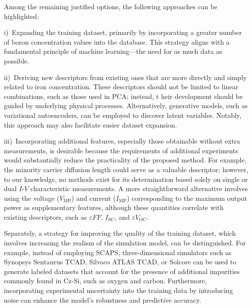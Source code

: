 \documentclass[a4paper,fleqn]{cas-sc}
\begin{document}
Among the remaining justified options, the following approaches can be highlighted:

\noindent
i)~Expanding the training dataset, primarily by incorporating a greater number of boron concentration values into the database. 
This strategy aligns with a fundamental principle of machine learning—the need for as much data as possible.

\noindent
ii)~Deriving new descriptors from existing ones that are more directly and simply related to iron concentration. 
These descriptors should not be limited to linear combinations, such as those used in PCA; instead, t
heir development should be guided by underlying physical processes. 
Alternatively, generative models, such as variational autoencoders, 
can be employed to discover latent variables. 
Notably, this approach may also facilitate easier dataset expansion.

\noindent
iii)~Incorporating additional features, especially those obtainable without extra measurements, 
is desirable because the requirements of additional experiments would substantially reduce 
the practicality of the proposed method. 
For example, the minority carrier diffusion length could serve as a valuable descriptor; 
however, to our knowledge, no methods exist for its determination based solely
on single or dual $I$-$V$ characteristic measurements. 
A more straightforward alternative involves using the voltage ($V_\mathrm{MP}$) and current ($I_\mathrm{MP}$) 
corresponding to the maximum output power as supplementary features, 
although these quantities correlate with existing descriptors, such as $\varepsilon F\!F$, $I_\mathrm{SC}$, 
and $\varepsilon V_\mathrm{OC}$.

Separately, a strategy for improving the quality of the training dataset, 
which involves increasing the realism of the simulation model, can be distinguished. 
For example, instead of employing SCAPS, three-dimensional simulators such as Synopsys Sentaurus TCAD, 
Silvaco ATLAS TCAD, or Solcore can be used to generate labeled datasets 
that account for the presence of additional impurities commonly found in Cz-Si, 
such as oxygen and carbon. 
Furthermore, incorporating experimental uncertainty into the training data by introducing noise 
can enhance the model’s robustness and predictive accuracy.
\end{document}
